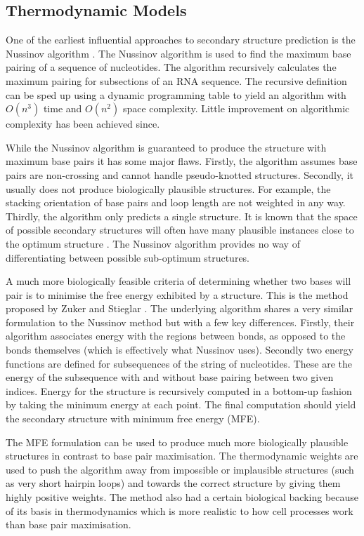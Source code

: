 \documentclass[journal]{IEEEtran}
\begin{document}
\subsection{Thermodynamic Models}
\label{subsec:thermodynamic-models}

One of the earliest influential approaches to secondary structure prediction is the Nussinov algorithm \cite{nussinov1980fast}. The Nussinov algorithm is used to find the maximum base pairing of a sequence of nucleotides. The algorithm recursively calculates the maximum pairing for subsections of an RNA sequence. The recursive definition can be sped up using a dynamic programming table to yield an algorithm with $O(n^3)$ time and $O(n^2)$ space complexity. Little improvement on algorithmic complexity has been achieved since. 

While the Nussinov algorithm is guaranteed to produce the structure with maximum base pairs it has some major flaws. Firstly, the algorithm assumes base pairs are non-crossing and cannot handle pseudo-knotted structures. Secondly, it usually does not produce biologically plausible structures. For example, the stacking orientation of base pairs and loop length are not weighted in any way. Thirdly, the algorithm only predicts a single structure. It is known that the space of possible secondary structures will often have many plausible instances close to the optimum structure \cite{mccaskill1990equilibrium}. The Nussinov algorithm provides no way of differentiating between possible sub-optimum structures. 

A much more biologically feasible criteria of determining whether two bases will pair is to minimise the free energy exhibited by a structure. This is the method proposed by Zuker and Stieglar \cite{zuker1981optimal}. The underlying algorithm shares a very similar formulation to the Nussinov method but with a few key differences. Firstly, their algorithm associates energy with the regions between bonds, as opposed to the bonds themselves (which is effectively what Nussinov uses). Secondly two energy functions are defined for subsequences of the string of nucleotides. These are the energy of the subsequence with and without base pairing between two given indices. Energy for the structure is recursively computed in a bottom-up fashion by taking the minimum energy at each point. The final computation should yield the secondary structure with minimum free energy (MFE).

The MFE formulation can be used to produce much more biologically plausible structures in contrast to base pair maximisation. The thermodynamic weights are used to push the algorithm away from impossible or implausible structures (such as very short hairpin loops) and towards the correct structure by giving them highly positive weights. The method also had a certain biological backing because of its basis in thermodynamics which is more realistic to how cell processes work than base pair maximisation. 
\end{document}
